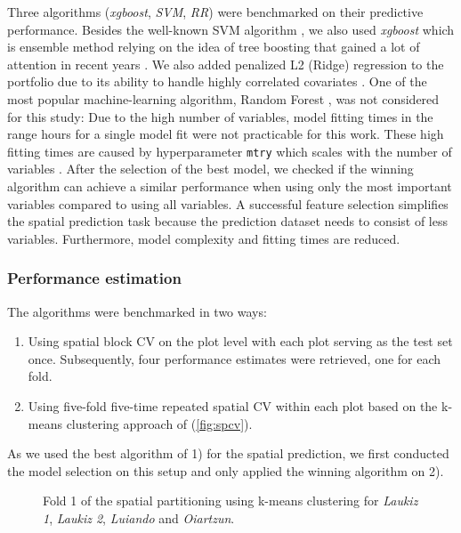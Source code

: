 \documentclass[review]{elsarticle}
\begin{document}
\noindent Three algorithms (\textit{xgboost}, \textit{\ac{SVM}}, \textit{\ac{RR}}) were benchmarked on their predictive performance.
Besides the well-known \ac{SVM} algorithm \citep{Vapnik1998}, we also used \textit{xgboost} which is ensemble method relying on the idea of tree boosting that gained a lot of attention in recent years \citep{chenXGBoostScalableTree2016}.
We also added penalized L2 (Ridge) regression to the portfolio due to its ability to handle highly correlated covariates \citep{hoerlRidgeRegressionBiased1970}.
One of the most popular machine-learning algorithm, Random Forest \citep{Breiman2001}, was not considered for this study: Due to the high number of variables, model fitting times in the range hours for a single model fit were not practicable for this work.
These high fitting times are caused by hyperparameter \texttt{mtry} which scales with the number of variables \citep{Probst2018b}.
After the selection of the best model, we checked if the winning algorithm can achieve a similar performance when using only the most important variables compared to using all variables.
A successful feature selection simplifies the spatial prediction task because the prediction dataset needs to consist of less variables.
Furthermore, model complexity and fitting times are reduced.

\subsubsection{Performance estimation}

\noindent The algorithms were benchmarked in two ways:

\begin{enumerate}
	\item Using spatial block \ac{CV} on the plot level with each plot serving as the test set once.
	      Subsequently, four performance estimates were retrieved, one for each fold.
	\item Using five-fold five-time repeated spatial \ac{CV} within each plot based on the k-means clustering approach of \cite{sperrorest} (\autoref{fig:spcv}).
\end{enumerate}

\noindent As we used the best algorithm of 1) for the spatial prediction, we first conducted the model selection on this setup and only applied the winning algorithm on 2).

\begin{figure} [t!]
	\begin{center}
		\caption{Fold 1 of the spatial partitioning using k-means clustering for \textit{Laukiz 1}, \textit{Laukiz 2}, \textit{Luiando} and \textit{Oiartzun}.}
		\label{fig:spcv}
	\end{center}
\end{figure}
\end{document}

